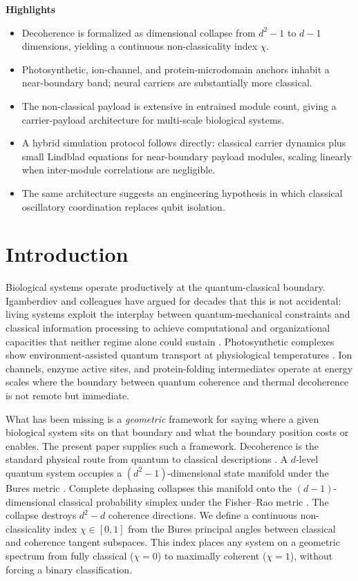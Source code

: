 \documentclass[11pt,a4paper]{article}
\theoremstyle{definition}
\theoremstyle{remark}
\begin{document}
\bigskip
\noindent\textbf{Highlights}
\begin{itemize}[nosep,leftmargin=*]
\item Decoherence is formalized as dimensional collapse from $d^2{-}1$ to $d{-}1$ dimensions, yielding a continuous non-classicality index $\chi$.
\item Photosynthetic, ion-channel, and protein-microdomain anchors inhabit a near-boundary band; neural carriers are substantially more classical.
\item The non-classical payload is extensive in entrained module count, giving a carrier-payload architecture for multi-scale biological systems.
\item A hybrid simulation protocol follows directly: classical carrier dynamics plus small Lindblad equations for near-boundary payload modules, scaling linearly when inter-module correlations are negligible.
\item The same architecture suggests an engineering hypothesis in which classical oscillatory coordination replaces qubit isolation.
\end{itemize}

\section{Introduction}
\label{sec:intro}

Biological systems operate productively at the quantum-classical boundary. Igamberdiev and colleagues have argued for decades that this is not accidental: living systems exploit the interplay between quantum-mechanical constraints and classical information processing to achieve computational and organizational capacities that neither regime alone could sustain \cite{igamberdiev1993,igamberdiev2021qcborder}. Photosynthetic complexes show environment-assisted quantum transport at physiological temperatures \cite{engel2007evidence,mohseni2008environment,plenio2008dephasing,cao2020quantum}. Ion channels, enzyme active sites, and protein-folding intermediates operate at energy scales where the boundary between quantum coherence and thermal decoherence is not remote but immediate.

What has been missing is a \emph{geometric} framework for saying where a given biological system sits on that boundary and what the boundary position costs or enables. The present paper supplies such a framework. Decoherence is the standard physical route from quantum to classical descriptions \cite{zeh1970interpretation,zurek2003decoherence,schlosshauer2005decoherence}. A $d$-level quantum system occupies a $(d^2-1)$-dimensional state manifold under the Bures metric \cite{bures1969extension,braunstein1994statistical,petz1996monotone}. Complete dephasing collapses this manifold onto the $(d-1)$-dimensional classical probability simplex under the Fisher--Rao metric \cite{rao1945information,amari1985differential}. The collapse destroys $d^2-d$ coherence directions. We define a continuous non-classicality index $\chi\in[0,1]$ from the Bures principal angles between classical and coherence tangent subspaces. This index places any system on a geometric spectrum from fully classical ($\chi=0$) to maximally coherent ($\chi=1$), without forcing a binary classification.
\end{document}
